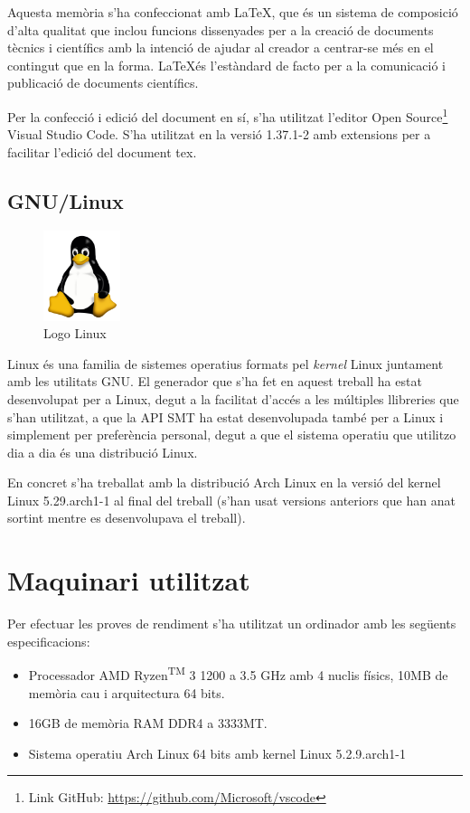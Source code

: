 \documentclass[11pt,a4paper,twoside]{report}
\begin{document}
  Aquesta memòria s'ha confeccionat amb \LaTeX, que és un sistema de composició d'alta qualitat que inclou funcions dissenyades per a la creació de documents tècnics i científics amb la intenció de ajudar al creador a centrar-se més en el contingut que en la forma.
\LaTeX és l'estàndard de facto per a la comunicació i publicació de documents científics. 

Per la confecció i edició del document en sí, s'ha utilitzat l'editor Open Source\footnote{Link GitHub: \url{https://github.com/Microsoft/vscode}} Visual Studio Code. S'ha utilitzat en la versió 1.37.1-2 amb extensions per a facilitar l'edició del document tex.



  \subsection{GNU/Linux}
  \begin{figure}[ht!]
    \centering
    \includegraphics[width=0.2\textwidth]{Diagrames/Linux.png}
    \caption{Logo Linux}
    \label{fig:linux}
  \end{figure}
  Linux és una familia de sistemes operatius formats pel \textit{kernel} Linux juntament amb les utilitats GNU. 
  El generador que s'ha fet en aquest treball ha estat desenvolupat per a Linux, degut a la facilitat d'accés a les múltiples llibreries que s'han utilitzat, a que la API SMT ha estat desenvolupada també per a Linux i simplement per preferència personal, degut a que el sistema operatiu que utilitzo dia a dia és una distribució Linux.

  En concret s'ha treballat amb la distribució Arch Linux en la versió del kernel Linux 5.29.arch1-1 al final del treball (s'han usat versions anteriors que han anat sortint mentre es desenvolupava el treball).


  \section{Maquinari utilitzat}
  Per efectuar les proves de rendiment s'ha utilitzat un ordinador amb les següents especificacions:
  \begin{itemize}
    \item Processador AMD Ryzen\textsuperscript{TM} 3 1200 a 3.5 GHz amb 4 nuclis físics,  10MB de memòria cau i arquitectura 64 bits.
    \item 16GB de memòria RAM DDR4 a 3333MT.
    \item Sistema operatiu Arch Linux 64 bits amb kernel Linux 5.2.9.arch1-1
  \end{itemize} 
  
\end{document}

